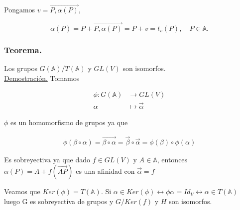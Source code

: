 \documentclass[12pt, a4paper, ones, notitlepage, openany,titlepage]{article}
\begin{document}
Pongamos $v=\overrightarrow{P, \alpha(P)}$,

$$
\alpha(P)=P+\overrightarrow{P, \alpha(P)}=P+v=t_{v}(P), \quad P \in \mathbb{A} .
$$

\subsubsection{Teorema.} Los grupos $G(\mathbb{A}) / T(\mathbb{A})$ y $G L(V)$ son isomorfos.\\

\underline{Demostración.} Tomamos

$$
\begin{aligned}
\phi: G(\mathbb{A}) & \longrightarrow G L(V) \\
\alpha & \longmapsto \vec{\alpha}
\end{aligned}
$$

$\phi$ es un homomorfismo de grupos ya que

$$
\begin{aligned}
	\phi(\beta\circ\alpha)=\overrightarrow{\beta\circ\alpha}=\vec{\beta}\circ\vec{\alpha}=\phi(\beta)\circ\phi(\alpha)
\end{aligned}
$$

Es sobreyectiva ya que dado $f\in GL(V)$ y $A\in\mathbb{A}$, entonces $\alpha(P) = A + f(\overrightarrow{AP})$ es una afinidad con $\vec{\alpha}=f$

Veamos que $Ker(\phi)=T(\mathbb{A})$. Si $\alpha\in Ker(\phi) \longleftrightarrow \phi{\alpha} = Id_{V} \longleftrightarrow \alpha\in T(\mathbb{A})$ luego G es sobreyectiva de grupos y $G/Ker(f)$ y $H$ son isomorfos.
\end{document}
